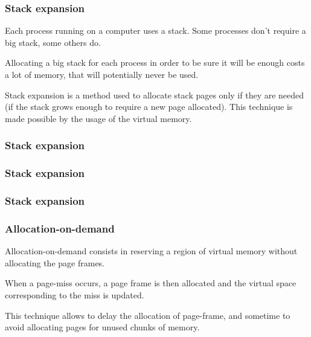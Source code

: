 \begin{frame}
  \frametitle{Stack expansion}

  Each process running on a computer uses a stack. Some processes don't require a big stack, some others do.

  \-

  Allocating a big stack for each process in order to be sure it will be enough costs a lot of memory, that will potentially never be used.

  \-

  Stack expansion is a method used to allocate stack pages only if they are needed (if the stack grows enough to require a new page allocated). This technique is made possible by the usage of the virtual memory.  

\end{frame}

\begin{frame}
  \frametitle{Stack expansion}

  \begin{center}
  \end{center}

\end{frame}

\begin{frame}
  \frametitle{Stack expansion}

  \begin{center}
  \end{center}

\end{frame}

\begin{frame}
  \frametitle{Stack expansion}

  \begin{center}
  \end{center}

\end{frame}


\begin{frame}
  \frametitle{Allocation-on-demand}

  Allocation-on-demand consists in reserving a region of virtual
  memory without allocating the page frames.

  \-

  When a page-miss occurs, a page frame is then allocated and the
  virtual space corresponding to the miss is updated.

  \-

  This technique allows to delay the allocation of page-frame, and
  sometime to avoid allocating pages for unused chunks of memory.

\end{frame}

